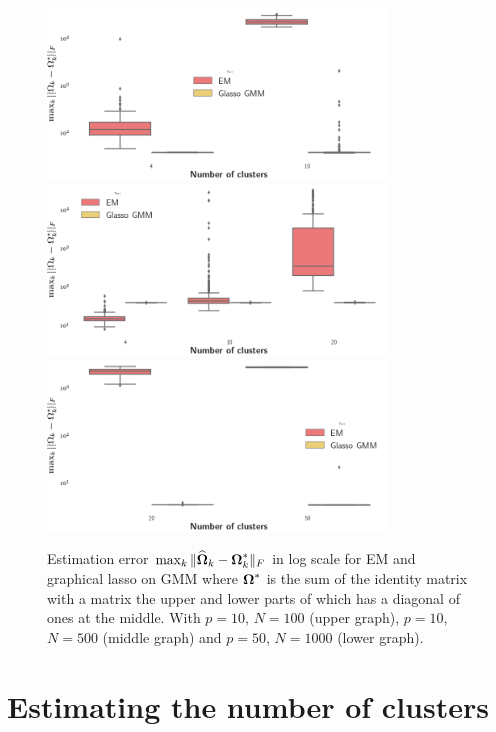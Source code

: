 \begin{figure}
\centering
\includegraphics[width=0.8\textwidth]{TeX_files/graph_lasso_diag_upper10_100.png} 
\includegraphics[width=0.8\textwidth]{TeX_files/graph_lasso_diag_upper10_500.png}
\includegraphics[width=0.8\textwidth]{TeX_files/graph_lasso_diag_upper50_1000.png} 
\caption{Estimation error $\max_k\|\widehat{\boldsymbol\Omega}_k-\boldsymbol\Omega_k^*\|_F$ in log scale for EM and graphical lasso on GMM where $\boldsymbol\Omega^*$ is the sum of the identity matrix with a matrix the upper and lower parts of which has a diagonal of ones at the middle.  With $p=10$, $N=100$ (upper graph), $p=10$, $N=500$ (middle graph) and $p=50$, $N=1000$ (lower graph).}
\label{fig:glasso_res_simu1_upper} 
\end{figure}

\section{Estimating the number of clusters}
\label{estim_nb_clusters_sect}

